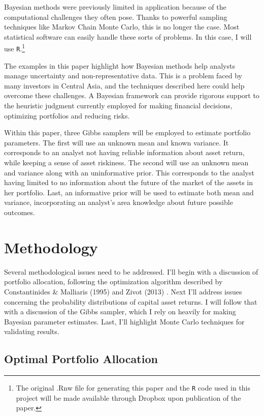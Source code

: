\documentclass[a4paper]{article}\usepackage[]{graphicx}\usepackage[]{color}
\begin{document}
Bayesian methods were previously limited in application because of the computational challenges they often pose. Thanks to powerful sampling techniques like Markov Chain Monte Carlo, this is no longer the case. Most statistical software can easily handle these sorts of problems. In this case, I will use \texttt{R}.\footnote{The original .Rnw file for generating this paper and the \texttt{R} code used in this project will be made available through Dropbox upon publication of the paper.}

The examples in this paper highlight how Bayesian methods help analysts manage uncertainty and non-representative data. This is a problem faced by many investors in Central Asia, and the techniques described here could help overcome these challenges. A Bayesian framework can provide rigorous support to the heuristic judgment currently employed for making financial decisions, optimizing portfolios and reducing risks.

Within this paper, three Gibbs samplers will be employed to estimate portfolio parameters. The first will use an unknown mean and known variance. It corresponds to an analyst not having reliable information about asset return, while keeping a sense of asset riskiness. The second will use an unknown mean and variance along with an uninformative prior. This corresponds to the analyst having limited to no information about the future of the market of the assets in her portfolio. Last, an informative prior will be used to estimate both mean and variance, incorporating an analyst's area knowledge about future possible outcomes.

\section{Methodology}

Several methodological issues need to be addressed. I'll begin with a discussion of portfolio allocation, following the optimization algorithm described by Constantinides \& Malliaris (1995) \cite{const95} and Zivot (2013) \cite{zivot13}. Next I'll address issues concerning the probability distributions of capital asset returns. I will follow that with a discussion of the Gibbs sampler, which I rely on heavily for making Bayesian parameter estimates. Last, I'll highlight Monte Carlo techniques for validating results.

\subsection{Optimal Portfolio Allocation}
\end{document}
